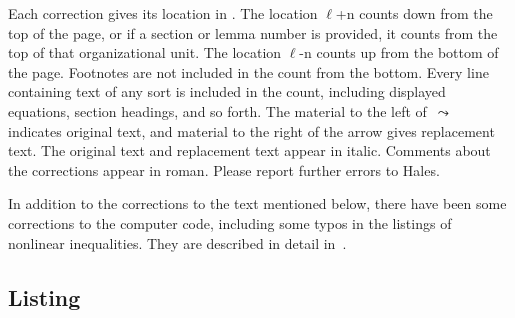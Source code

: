 \documentclass[11pt]{amsart}
\def\lto{\ensuremath{\,\leadsto\,}}
\def\line{$\ell$}
\begin{document}
Each correction gives its location in \cite{Hales:2006:DCG}.
The location
\line+n counts down from the top of the page, or
if a section or lemma number is provided, it
counts from the top of that organizational unit.
The location \line-n counts up from the bottom
of the page. Footnotes are not included in the
count from the bottom.  Every line containing
text of any sort is included in the count,
including displayed equations, section headings,
and so forth.  The material to the left of $\lto$ 
indicates original text, and material to the right of the
arrow gives replacement text.  
The original text and replacement text appear in italic.
Comments about the corrections appear in roman. 
Please report further errors to Hales.


In addition to the corrections to the text mentioned below, 
there have been some corrections to the computer code, including some typos in the
listings of nonlinear inequalities.
They are described in detail in~\cite{Hales:2008:Errata}.


\subsection*{Listing}\hfill\break
{}\baselineskip
\end{document}
